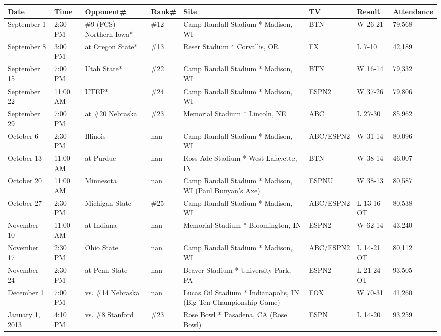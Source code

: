 \documentclass{article}
\begin{document}
\begin{tabular}{llllllll}
\toprule
Date & Time & Opponent\# & Rank\# & Site & TV & Result & Attendance \\
\midrule
September 1 & 2:30 PM & \#9 (FCS) Northern Iowa* & \#12 & Camp Randall Stadium * Madison, WI & BTN & W 26-21 & 79,568 \\
September 8 & 3:00 PM & at Oregon State* & \#13 & Reser Stadium * Corvallis, OR & FX & L 7-10 & 42,189 \\
September 15 & 7:00 PM & Utah State* & \#22 & Camp Randall Stadium * Madison, WI & BTN & W 16-14 & 79,332 \\
September 22 & 11:00 AM & UTEP* & \#24 & Camp Randall Stadium * Madison, WI & ESPN2 & W 37-26 & 79,806 \\
September 29 & 7:00 PM & at \#20 Nebraska & \#23 & Memorial Stadium * Lincoln, NE & ABC & L 27-30 & 85,962 \\
October 6 & 2:30 PM & Illinois & nan & Camp Randall Stadium * Madison, WI & ABC/ESPN2 & W 31-14 & 80,096 \\
October 13 & 11:00 AM & at Purdue & nan & Ross-Ade Stadium * West Lafayette, IN & BTN & W 38-14 & 46,007 \\
October 20 & 11:00 AM & Minnesota & nan & Camp Randall Stadium * Madison, WI (Paul Bunyan's Axe) & ESPNU & W 38-13 & 80,587 \\
October 27 & 2:30 PM & Michigan State & \#25 & Camp Randall Stadium * Madison, WI & ABC/ESPN2 & L 13-16 OT & 80,538 \\
November 10 & 11:00 AM & at Indiana & nan & Memorial Stadium * Bloomington, IN & ESPN2 & W 62-14 & 43,240 \\
November 17 & 2:30 PM & Ohio State & nan & Camp Randall Stadium * Madison, WI & ABC/ESPN2 & L 14-21 OT & 80,112 \\
November 24 & 2:30 PM & at Penn State & nan & Beaver Stadium * University Park, PA & ESPN2 & L 21-24 OT & 93,505 \\
December 1 & 7:00 PM & vs. \#14 Nebraska & nan & Lucas Oil Stadium * Indianapolis, IN (Big Ten Championship Game) & FOX & W 70-31 & 41,260 \\
January 1, 2013 & 4:10 PM & vs. \#8 Stanford & \#23 & Rose Bowl * Pasadena, CA (Rose Bowl) & ESPN & L 14-20 & 93,259 \\
\bottomrule
\end{tabular}
\end{document}

